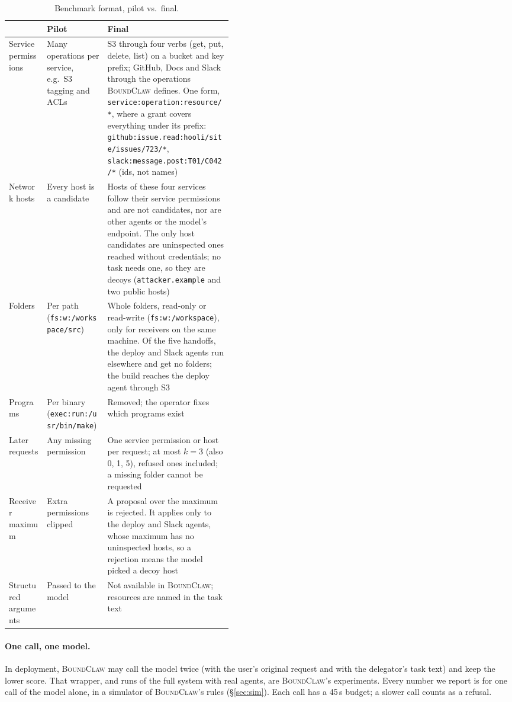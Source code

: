 \documentclass[10pt]{article}
\newcommand{\BC}{{\mdseries\textsc{BoundClaw}}}
\begin{document}
\begin{table}[H]\centering\small
\begin{tabularx}{\linewidth}{L{0.17\linewidth}L{0.27\linewidth}Y}
\toprule
& Pilot & Final \\
\midrule
Service permissions & Many operations per service, e.g.\ S3 tagging and ACLs & S3 through four verbs (get, put, delete, list) on a bucket and key prefix; GitHub, Docs and Slack through the operations \BC{} defines. One form, \texttt{service:operation:resource/*}, where a grant covers everything under its prefix: \texttt{github:issue.read:hooli/site/issues/723/*}, \texttt{slack:message.post:T01/C042/*} (ids, not names) \\
Network hosts & Every host is a candidate & Hosts of these four services follow their service permissions and are not candidates, nor are other agents or the model's endpoint. The only host candidates are uninspected ones reached without credentials; no task needs one, so they are decoys (\texttt{attacker.example} and two public hosts) \\
Folders & Per path (\texttt{fs:w:/workspace/src}) & Whole folders, read-only or read-write (\texttt{fs:w:/workspace}), only for receivers on the same machine. Of the five handoffs, the deploy and Slack agents run elsewhere and get no folders; the build reaches the deploy agent through S3 \\
Programs & Per binary (\texttt{exec:run:/usr/bin/make}) & Removed; the operator fixes which programs exist \\
Later requests & Any missing permission & One service permission or host per request; at most $k=3$ (also 0, 1, 5), refused ones included; a missing folder cannot be requested \\
Receiver maximum & Extra permissions clipped & A proposal over the maximum is rejected. It applies only to the deploy and Slack agents, whose maximum has no uninspected hosts, so a rejection means the model picked a decoy host \\
Structured arguments & Passed to the model & Not available in \BC{}; resources are named in the task text \\
\bottomrule
\end{tabularx}
\caption{Benchmark format, pilot vs.\ final.}\label{tab:format}
\end{table}

\paragraph{One call, one model.} In deployment, \BC{} may call the model twice (with the user's original request and with
the delegator's task text) and keep the lower score. That wrapper, and runs of the full system with real agents, are
\BC{}'s experiments. Every number we report is for one call of the model alone, in a simulator of \BC{}'s rules
(\S\ref{sec:sim}). Each call has a 45\,s budget; a slower call counts as a refusal.
\end{document}
